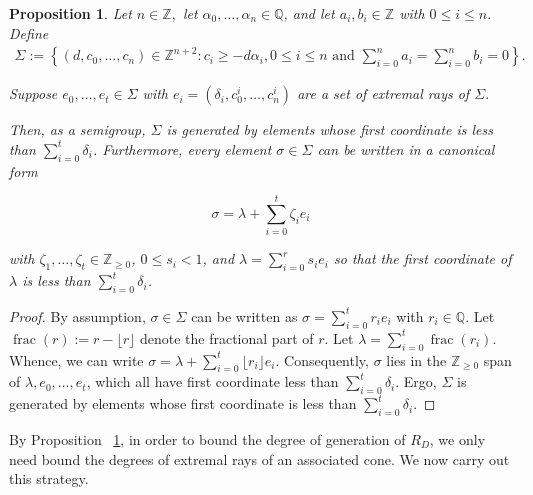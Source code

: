 \documentclass{amsart}
\theoremstyle{plain}
\newtheorem{prop}[thm]{Proposition}
\theoremstyle{definition}
\theoremstyle{remark}
\numberwithin{equation}{subsection}
\newcommand\bq{{\mathbb Q}}
\newcommand\bz{{\mathbb Z}}
\newcommand\pdeg{\delta}
\DeclareMathOperator{\fr}{frac}
\begin{document}
\begin{prop}
\label{prop:cone-generation}
Let $n \in \bz,$ let $\alpha_0, \ldots, \alpha_n \in \bq$, and let
$a_i, b_i \in \bz$ with $0 \leq i \leq n.$ Define
\begin{align*}
	\Sigma := \left \{(d, c_0, \ldots, c_n) \in \bz^{n + 2} \colon c_i \geq -
	d \alpha_i, 0 \leq i \leq n \text{ and } \sum_{i = 0}^{n} a_i =
	\sum_{i	= 0}^{n}b_i = 0 \right \}.
\end{align*}

\noindent
Suppose $e_0, \ldots, e_t \in \Sigma$ with $e_i = (\pdeg_i, c_0^i,
\ldots, c_n^i)$ are a set of extremal rays of $\Sigma$.

Then, as a semigroup, $\Sigma$ is generated by
elements whose first coordinate is less than $\sum_{i = 0}^{t}
\pdeg_i$. Furthermore, every element $\sigma \in \Sigma$ can be
written in a canonical form 

\begin{equation}
	\label{eqn:sigma-canonical-form}
	\sigma = \lambda + \sum_{i = 0}^{t} \zeta_i e_i
\end{equation}

\noindent
with $\zeta_1, \ldots, \zeta_t \in \bz_{\geq 0}$, $0 \leq s_i < 1$, and $\lambda = \sum_{i = 0}^{r} s_i e_i$ 
so that the
first coordinate of $\lambda$ is less than $\sum_{i=0}^{t}\pdeg_i$.
\end{prop}

\begin{proof}
By assumption, $\sigma \in \Sigma$ can be written as $\sigma = \sum_
{i = 0}^{t} r_i e_i$ with $r_i \in \bq$. Let $\fr(r) := r - \lfloor r
\rfloor$ denote the fractional part of $r$. Let $\lambda = \sum_{i = 0}
^{t} \fr(r_i)$. Whence, we can write $\sigma = \lambda + \sum_{i = 0}
^{t} \lfloor r_i \rfloor e_i.$ Consequently, $\sigma$ lies in the
$\bz_{\geq 0}$ span of $\lambda, e_0, \ldots, e_t$, which all have
first coordinate less than $\sum_{i=0}^{t} \pdeg_i$. Ergo, $\Sigma$ is
generated by elements whose first coordinate is less than
$\sum_{i = 0}^{t} \pdeg_i$.
\end{proof}

By Proposition ~\ref{prop:cone-generation}, in order to bound
the degree of generation of $R_D$, we only need bound
the degrees of extremal rays of an associated cone. We now carry out
this strategy.
\end{document}
